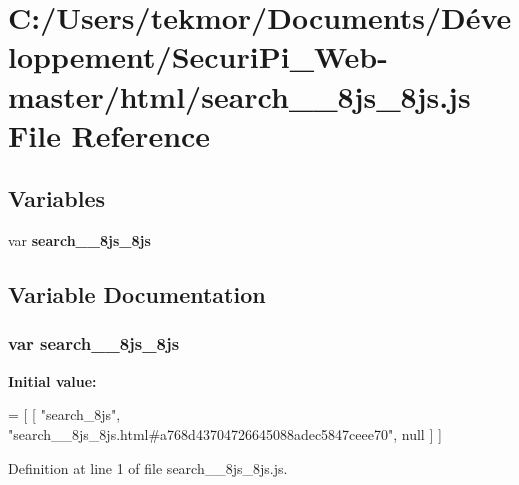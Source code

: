 \section{C\+:/\+Users/tekmor/\+Documents/\+Développement/\+Securi\+Pi\+\_\+\+Web-\/master/html/search\+\_\+\+\_\+8js\+\_\+8js.js File Reference}
\label{search____8js__8js_8js}
\subsection*{Variables}
\begin{DoxyCompactItemize}
\item 
var {\bf search\+\_\+\+\_\+8js\+\_\+8js}
\end{DoxyCompactItemize}


\subsection{Variable Documentation}
\subsubsection[{search\+\_\+\+\_\+8js\+\_\+8js}]{\setlength{\rightskip}{0pt plus 5cm}var search\+\_\+\+\_\+8js\+\_\+8js}\label{search____8js__8js_8js_a3d5651f56ae791047732aa8590c1f12f}
{\bfseries Initial value\+:}
\begin{DoxyCode}
=
[
    [ \textcolor{stringliteral}{"search\_8js"}, \textcolor{stringliteral}{"search\_\_8js\_8js.html#a768d43704726645088adec5847ceee70"}, null ]
]
\end{DoxyCode}


Definition at line 1 of file search\+\_\+\+\_\+8js\+\_\+8js.\+js.

